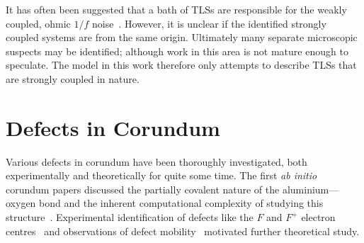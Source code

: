 
It has often been suggested that a bath of TLSs are responsible for the weakly coupled, ohmic $1/f$ noise~\cite{Dutta1981}.
However, it is unclear if the identified strongly coupled systems are from the same origin.
Ultimately many separate microscopic suspects may be identified; although work in this area is not mature enough to speculate.
The model in this work therefore only attempts to describe TLSs that are strongly coupled in nature.


\section{Defects in Corundum}\label{sec:cordef}
Various defects in corundum have been thoroughly investigated, both experimentally and theoretically for quite some time.
The first \emph{ab initio} corundum papers discussed the partially covalent nature of the aluminium---oxygen bond and the inherent computational complexity of studying this structure~\cite{Causa1987}.
Experimental identification of defects like the $F$
and $F^+$ electron centres~\cite{Kotomin1989} and observations of defect mobility~\cite{Kulis1991} motivated further theoretical study.

